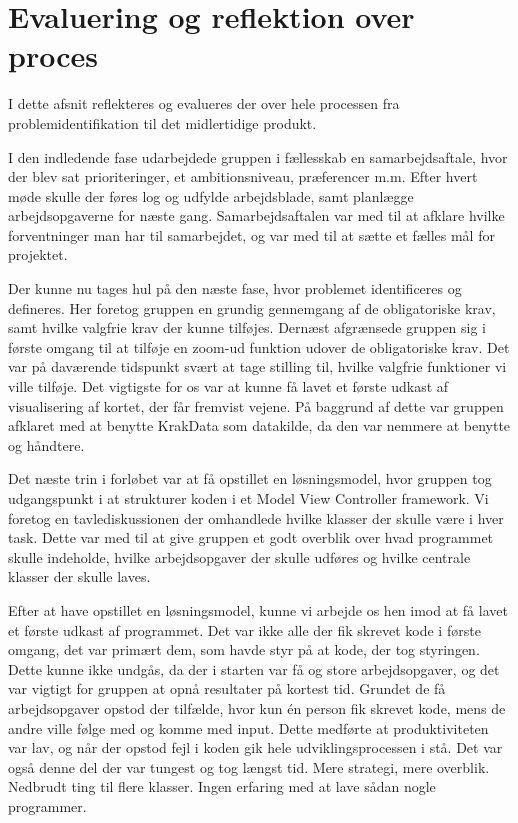 \section{Evaluering og reflektion over proces}
\label{sec:evaluering_og_reflektion_over_proces}

I dette afsnit reflekteres og evalueres der over hele processen fra problemidentifikation til det midlertidige produkt. 

I den indledende fase udarbejdede gruppen i fællesskab en samarbejdsaftale, hvor der blev sat prioriteringer, et ambitionsniveau, præferencer m.m. Efter hvert møde skulle der føres log og udfylde arbejdsblade, samt planlægge arbejdsopgaverne for næste gang. Samarbejdsaftalen var med til at afklare hvilke forventninger man har til samarbejdet, og var med til at sætte et fælles mål for projektet.

Der kunne nu tages hul på den næste fase, hvor problemet identificeres og defineres. Her foretog gruppen en grundig gennemgang af de obligatoriske krav, samt hvilke valgfrie krav der kunne tilføjes.  Dernæst afgrænsede gruppen sig i første omgang til at tilføje en zoom-ud funktion udover de obligatoriske krav. Det var på daværende tidspunkt svært at tage stilling til, hvilke valgfrie funktioner vi ville tilføje. Det vigtigste for os var at kunne få lavet et første udkast af visualisering af kortet, der får fremvist vejene. På baggrund af dette var gruppen afklaret med at benytte KrakData som datakilde, da den var nemmere at benytte og håndtere.   

Det næste trin i forløbet var at få opstillet en løsningsmodel, hvor gruppen tog udgangspunkt i at strukturer koden i et Model View Controller framework. Vi foretog en tavlediskussionen der omhandlede hvilke klasser der skulle være i hver task. Dette var med til at give gruppen et godt overblik over hvad programmet skulle indeholde, hvilke arbejdsopgaver der skulle udføres og hvilke centrale klasser der skulle laves. 

Efter at have opstillet en løsningsmodel, kunne vi arbejde os hen imod at få lavet et første udkast af programmet. Det var ikke alle der fik skrevet kode i første omgang, det var primært dem, som havde styr på at kode, der tog styringen. Dette kunne ikke undgås, da der i starten var få og store arbejdsopgaver, og det var vigtigt for gruppen at opnå resultater på kortest tid. Grundet de få arbejdsopgaver opstod der tilfælde, hvor kun én person fik skrevet kode, mens de andre ville følge med og komme med input. Dette medførte at produktiviteten var lav, og når der opstod fejl i koden gik hele udviklingsprocessen i stå. Det var også denne del der var tungest og tog længst tid. 
Mere strategi, mere overblik. Nedbrudt ting til flere klasser. Ingen erfaring med at lave sådan nogle programmer.

